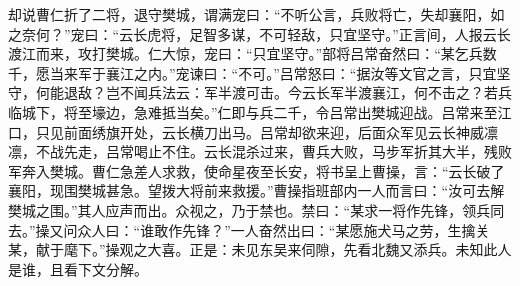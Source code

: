 却说曹仁折了二将，退守樊城，谓满宠曰：“不听公言，兵败将亡，失却襄阳，如之奈何？”宠曰：“云长虎将，足智多谋，不可轻敌，只宜坚守。”正言间，人报云长渡江而来，攻打樊城。仁大惊，宠曰：“只宜坚守。”部将吕常奋然曰：“某乞兵数千，愿当来军于襄江之内。”宠谏曰：“不可。”吕常怒曰：“据汝等文官之言，只宜坚守，何能退敌？岂不闻兵法云：军半渡可击。今云长军半渡襄江，何不击之？若兵临城下，将至壕边，急难抵当矣。”仁即与兵二千，令吕常出樊城迎战。吕常来至江口，只见前面绣旗开处，云长横刀出马。吕常却欲来迎，后面众军见云长神威凛凛，不战先走，吕常喝止不住。云长混杀过来，曹兵大败，马步军折其大半，残败军奔入樊城。曹仁急差人求救，使命星夜至长安，将书呈上曹操，言：“云长破了襄阳，现围樊城甚急。望拨大将前来救援。”曹操指班部内一人而言曰：“汝可去解樊城之围。”其人应声而出。众视之，乃于禁也。禁曰：“某求一将作先锋，领兵同去。”操又问众人曰：“谁敢作先锋？”一人奋然出曰：“某愿施犬马之劳，生擒关某，献于麾下。”操观之大喜。正是：未见东吴来伺隙，先看北魏又添兵。未知此人是谁，且看下文分解。